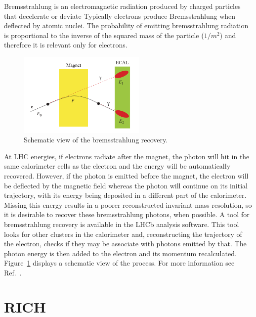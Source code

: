 Bremsstrahlung is an electromagnetic radiation produced by charged particles that decelerate or deviate 
Typically electrons produce Bremsstrahlung when deflected by atomic nuclei.
The probability of emitting bremsstrahlung radiation is proportional to the inverse of the squared mass of the
particle ($1/m^2$) and therefore it is relevant only for electrons.
%
\begin{figure}[h!]
\centering
\includegraphics[width=0.55\textwidth]{RKst/figs/brem_recovery.png}
\caption{Schematic view of the bremsstrahlung recovery. }
\label{fig:bremreco}
\end{figure}
%
At LHC energies, if electrons radiate after
the magnet, the photon will hit in the same calorimeter cells as the electron and the energy will be automatically
recovered. However, if the photon is emitted before the magnet, the electron will be deflected by the magnetic
field whereas the photon will continue on its initial trajectory, with its energy being deposited in a different
part of the calorimeter. Missing this energy results in a poorer reconstructed invariant mass resolution, so it is
desirable to recover these bremsstrahlung photons, when possible. A tool for bremsstrahlung recovery is available
in the LHCb analysis software. This tool looks for other clusters in the calorimeter and, reconstructing the trajectory
of the electron, checks if they may be associate with photons emitted by that. The photon energy is then added to 
the electron and its momentum recalculated. Figure~\ref{fig:bremreco} displays a schematic view of the process. 
For more information see Ref.~\cite{LHCb:2003ab}.

\section{RICH}

